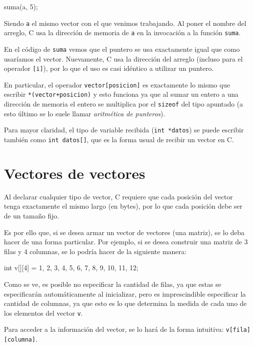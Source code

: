 \begin{codigo-c-plano}
    suma(a, 5);
\end{codigo-c-plano}

Siendo \lstinline!a! el mismo vector con el que venimos trabajando. Al
poner el nombre del arreglo, C usa la dirección de memoria de \lstinline!a!
en la invocación a la función \lstinline!suma!.

En el código de \lstinline!suma! vemos que el puntero se usa exactamente
igual que como usaríamos el vector. Nuevamente, C usa la dirección del
arreglo (incluso para el operador \lstinline![i]!), por lo que el uso es
casi idéntico a utilizar un puntero.

En particular, el operador \lstinline!vector[posicion]! es exactamente lo
mismo que escribir \lstinline!*(vector+posicion)! y esto funciona ya que al
sumar un entero a una dirección de memoria el entero se multiplica por el
\lstinline!sizeof! del tipo apuntado (a esto último se lo suele llamar
\textit{aritmética de punteros}).

Para mayor claridad, el tipo de variable recibida (\lstinline!int *datos!)
se puede escribir también como \lstinline!int datos[]!, que es la forma
usual de recibir un vector en C.

\section{Vectores de vectores}

Al declarar cualquier tipo de vector, C requiere que cada posición del
vector tenga exactamente el mismo largo (en bytes), por lo que cada
posición debe ser de un tamaño fijo.

Es por ello que, si se desea armar un vector de vectores (una matriz), se
lo deba hacer de una forma particular.  Por ejemplo, si se desea construir
una matriz de 3 filas y 4 columnas, se lo podría hacer de la siguiente
manera:

\begin{codigo-c-plano}
    int v[][4] = {{1, 2, 3, 4}, {5, 6, 7, 8}, {9, 10, 11, 12}};
\end{codigo-c-plano}

Como se ve, es posible no especificar la cantidad de filas, ya que estas se
especificarán automáticamente al inicializar, pero  es imprescindible
especificar la cantidad de columnas, ya que esto es lo que determina la
medida de cada uno de los elementos del vector \lstinline!v!.

Para acceder a la información del vector, se lo hará de la forma intuitiva:
\lstinline!v[fila][columna]!.

